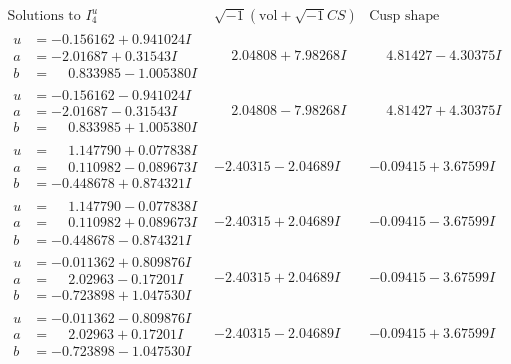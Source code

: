 \documentclass[1p]{elsarticle_modified}
\theoremstyle{definition}
\newcommand{\I}{\sqrt{-1}}
\begin{document}
$$\begin{array}{c|c|c}  
\text{Solutions to }I^u_{4}& \I (\text{vol} + \sqrt{-1}CS) & \text{Cusp shape}\\
 \hline 
\begin{aligned}
u &= -0.156162 + 0.941024 I \\
a &= -2.01687 + 0.31543 I \\
b &= \phantom{-}0.833985 - 1.005380 I\end{aligned}
 & \phantom{-}2.04808 + 7.98268 I & \phantom{-}4.81427 - 4.30375 I \\ \hline\begin{aligned}
u &= -0.156162 - 0.941024 I \\
a &= -2.01687 - 0.31543 I \\
b &= \phantom{-}0.833985 + 1.005380 I\end{aligned}
 & \phantom{-}2.04808 - 7.98268 I & \phantom{-}4.81427 + 4.30375 I \\ \hline\begin{aligned}
u &= \phantom{-}1.147790 + 0.077838 I \\
a &= \phantom{-}0.110982 - 0.089673 I \\
b &= -0.448678 + 0.874321 I\end{aligned}
 & -2.40315 - 2.04689 I & -0.09415 + 3.67599 I \\ \hline\begin{aligned}
u &= \phantom{-}1.147790 - 0.077838 I \\
a &= \phantom{-}0.110982 + 0.089673 I \\
b &= -0.448678 - 0.874321 I\end{aligned}
 & -2.40315 + 2.04689 I & -0.09415 - 3.67599 I \\ \hline\begin{aligned}
u &= -0.011362 + 0.809876 I \\
a &= \phantom{-}2.02963 - 0.17201 I \\
b &= -0.723898 + 1.047530 I\end{aligned}
 & -2.40315 + 2.04689 I & -0.09415 - 3.67599 I \\ \hline\begin{aligned}
u &= -0.011362 - 0.809876 I \\
a &= \phantom{-}2.02963 + 0.17201 I \\
b &= -0.723898 - 1.047530 I\end{aligned}
 & -2.40315 - 2.04689 I & -0.09415 + 3.67599 I \\ \hline\begin{aligned}

\end{aligned}
\end{array}$$
\end{document}

